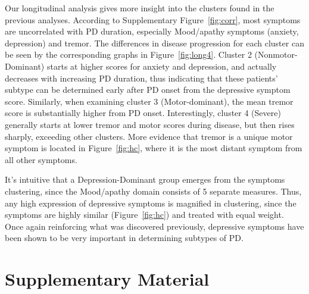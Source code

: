 \documentclass[preprint,5p]{elsarticle} %
\begin{document}
Our longitudinal analysis gives more insight into the clusters found in the previous analyses.
According to Supplementary Figure~\ref{fig:corr}, most symptoms are uncorrelated with PD duration, especially
Mood/apathy symptoms (anxiety, depression) and tremor.
The differences in disease progression for each cluster can be seen by the corresponding graphs in
Figure~\ref{fig:long4}. Cluster 2 (Nonmotor-Dominant) starts at higher
scores for anxiety and depression, and actually decreases with increasing PD duration, thus indicating that these patients' subtype can be determined
early after PD onset from the depressive symptom score. Similarly, when examining cluster 3
(Motor-dominant), the mean tremor score is substantially higher from PD onset.
Interestingly, cluster 4 (Severe) generally starts at lower tremor and motor scores during disease,
but then rises sharply, exceeding other clusters. More evidence that tremor is a unique motor
symptom is located in Figure~\ref{fig:hc}, where it is the most distant symptom from all other
symptoms.



It's intuitive that a Depression-Dominant group emerges from the symptoms clustering, since the
Mood/apathy domain consists of 5 separate measures. Thus, any high expression of depressive
symptoms is magnified in clustering, since the symptoms are highly similar (Figure~\ref{fig:hc})
and treated with equal weight. Once again reinforcing what was discovered previously, depressive
symptoms have been shown to be very important in determining subtypes of PD.

\section{Supplementary Material}
\end{document}
